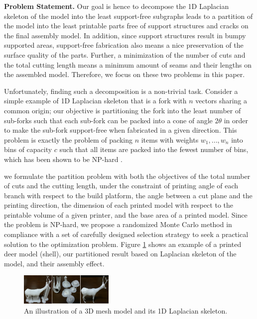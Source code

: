 \textbf{Problem Statement.} Our goal is hence to decompose the 1D Laplacian skeleton of the model into the least support-free subgraphs leads to a partition of the model into the least printable parts free of support structures and cracks on the final assembly model. In addition, since support structures result in bumpy supported areas, support-free fabrication also means a nice preservation of the surface quality of the parts. Further, a minimization of the number of cuts and the total cutting length means a minimum amount of seams and their lengths on the assembled model. Therefore, we focus on these two problems in this paper.

Unfortunately, finding such a decomposition is a non-trivial task. Consider a simple example of 1D Laplacian skeleton that is a fork with $n$ vectors sharing a common origin; our objective is partitioning the fork into the least number of sub-forks such that each sub-fork can be packed into a cone of angle $2\theta$ in order to make the sub-fork support-free when fabricated in a given direction. This problem is exactly the problem of packing $n$ items with weights $w_1, ..., w_n$ into bins of capacity $c$ such that all items are packed into the fewest number of bins, which has been shown to be NP-hard \cite{Fukunaga:2007}.

we formulate the partition problem with both the objectives of the total number of cuts and the cutting length, under the constraint of printing angle of each branch with respect to the build platform, the angle between a cut plane and the printing direction, the dimension of each printed model with respect to the printable volume of a given printer, and the base area of a printed model. Since the problem is NP-hard, we propose a randomized Monte Carlo method in compliance with a set of carefully designed selection strategy to seek a practical solution to the optimization problem. Figure \ref{fig:ex1} shows an example of a printed deer model (shell), our partitioned result based on Laplacian skeleton of the model, and their assembly effect.

\begin{figure}[t]
  \centering
  \includegraphics[width=0.4\textwidth]{figs/tree_with_skeleton.png}
  \caption{\label{fig:ex1}%
           An illustration of a 3D mesh model and its 1D Laplacian skeleton. }
\end{figure}
